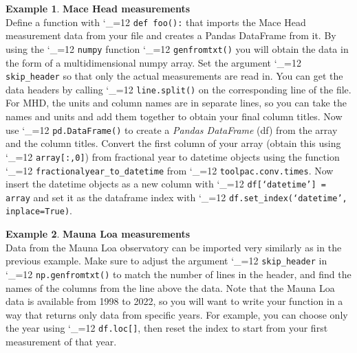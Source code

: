 \documentclass{article}
\makeatletter
\newcommand{\pyf}{%
  \begingroup\catcode`_=12
  \pyf@
}
\newcommand{\pyf@}[1]{\texttt{#1}\endgroup}
\theoremstyle{definition}
\newtheorem{exmp}{Example}[section]
\makeatother
\begin{document}
\begin{exmp}\textbf{Mace Head measurements} \\
Define a function with \pyf{def foo():} that imports the Mace Head measurement data from your file and creates a Pandas DataFrame from it. By using the \pyf{numpy} function \pyf{genfromtxt()} you will obtain the data in the form of a multidimensional numpy array. Set the argument \pyf{skip_header} so that only the actual measurements are read in. You can get the data headers by calling \pyf{line.split()} on the corresponding line of the file. For MHD, the units and column names are in separate lines, so you can take the names and units and add them together to obtain your final column titles. Now use \pyf{pd.DataFrame()} to create a \textit{Pandas DataFrame} (df) from the array and the column titles. Convert the first column of your array (obtain this using \pyf{array[:,0]}) from fractional year to datetime objects using the function \pyf{fractionalyear_to_datetime} from \pyf{toolpac.conv.times}. Now insert the datetime objects as a new column with \pyf{df[`datetime'] = array} and set it as the dataframe index with \pyf{df.set_index(`datetime', inplace=True)}. \end{exmp} 

\begin{exmp}\textbf{Mauna Loa measurements} \\
Data from the Mauna Loa observatory can be imported very similarly as in the previous example. Make sure to adjust the argument \pyf{skip_header} in \pyf{np.genfromtxt()} to match the number of lines in the header, and find the names of the columns from the line above the data. Note that the Mauna Loa data is available from 1998 to 2022, so you will want to write your function in a way that returns only data from specific years. For example, you can choose only the year using \pyf{df.loc[]}, then reset the index to start from your first measurement of that year. \end{exmp}
\end{document}
